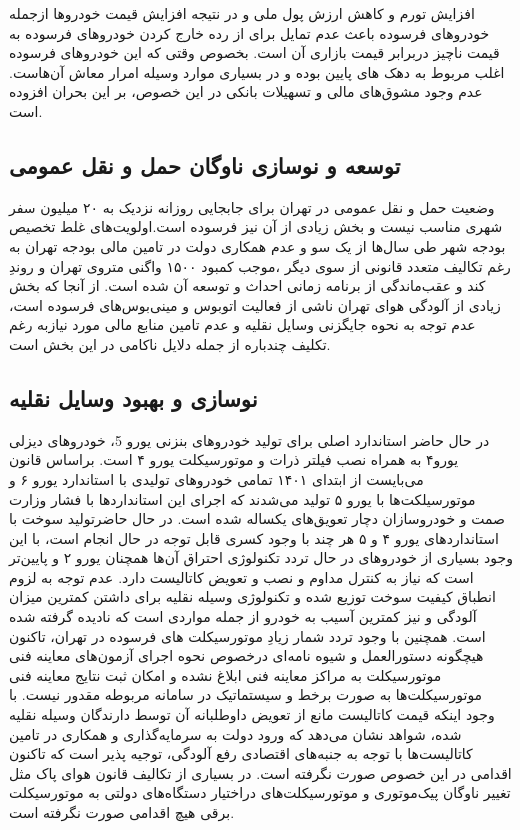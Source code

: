 \documentclass[12pt]{atu}
\begin{document}
افزایش تورم و کاهش ارزش پول ملی و در نتیجه افزایش قیمت خودروها ازجمله خودروهای فرسوده باعث عدم تمایل برای از رده خارج کردن خودروهای فرسوده به قیمت ناچیز دربرابر قیمت بازاری آن است. بخصوص وقتی که این خودروهای فرسوده اغلب مربوط به دهک های پایین بوده و در بسیاری موارد وسیله امرار معاش ‌آن‌هاست. عدم وجود مشوق‌های مالی و تسهیلات بانکی در این خصوص،  بر این بحران افزوده است. 
\cite{divan1400}
\cite{nosazi}
\cite{divan1399}
\cite{majles1385}
\cite{majles1400}
\subsection{توسعه و نوسازی ناوگان حمل و نقل عمومی}
وضعیت حمل و نقل عمومی در تهران برای جابجایی روزانه نزدیک به ۲۰ میلیون سفر شهری مناسب نیست و بخش زیادی از آن نیز فرسوده است.اولویت‌های غلط تخصیص بودجه شهر طی سال‌ها از یک سو و عدم همکاری دولت در تامین مالی بودجه تهران به رغم تکالیف متعدد قانونی از سوی دیگر ،موجب کمبود ۱۵۰۰ واگنی  متروی تهران و   روندِ کند و عقب‌ماندگی از برنامه زمانی احداث و توسعه آن شده است. 
\cite{shahrdotir}
از آنجا که بخش زیادی از آلودگی هوای تهران ناشی از فعالیت اتوبوس و مینی‌بوس‌های فرسوده است، عدم توجه به نحوه جایگزنی وسایل نقلیه و عدم تامین منابع مالی مورد نیازبه رغم تکلیف چندباره از جمله دلایل ناکامی در این بخش است.
\subsection{نوسازی و بهبود وسایل نقلیه}
در حال حاضر استاندارد اصلی برای تولید خودروهای بنزنی یورو 5، خودروهای دیزلی یورو۴ به همراه نصب فیلتر ذرات و موتورسیکلت یورو ۴ است. براساس قانون می‌بایست از ابتدای ۱۴۰۱ تمامی خودروهای تولیدی با استاندارد یورو ۶ و موتورسیلکت‌ها با یورو ۵ تولید می‌شدند که اجرای این استانداردها با فشار وزارت صمت و خودروسازان  دچار تعویق‌های یکساله شده است.
در حال حاضرتولید سوخت با استانداردهای یورو ۴ و ۵ هر چند با وجود کسری‌ قابل توجه در حال انجام است، با این وجود بسیاری از خودروهای در حال تردد تکنولوژی احتراق آن‌ها همچنان یورو ۲ و پایین‌تر است که نیاز به کنترل مداوم و نصب  و تعویض کاتالیست دارد. عدم توجه به لزوم انطباق کیفیت سوخت توزیع شده و تکنولوژی وسیله نقلیه برای داشتن کمترین میزان آلودگی و نیز کمترین آسیب به خودرو از جمله مواردی است که نادیده گرفته شده است.
همچنین با وجود تردد شمار زیادِ موتورسیکلت های فرسوده در تهران، تاکنون هیچگونه دستورالعمل و شیوه نامه‌ای درخصوص نحوه اجرای آزمون‌های معاینه فنی موتورسیکلت به مراکز معاینه فنی ابلاغ نشده و امکان ثبت نتایج معاینه فنی موتورسیکلت‌ها به صورت برخط و سیستماتیک در سامانه مربوطه مقدور نیست.
با وجود اینکه قیمت کاتالیست مانع از تعویض داوطلبانه آن توسط دارندگان وسیله نقلیه شده، شواهد نشان می‌دهد که ورود دولت به سرمایه‌گذاری و همکاری در تامین کاتالیست‌ها با توجه به جنبه‌های اقتصادی رفع آلودگی، توجیه پذیر است که تاکنون اقدامی در این خصوص صورت نگرفته است.
در بسیاری از تکالیف قانون هوای پاک مثل تغییر ناوگان پیک‌موتوری و موتورسیکلت‌های دراختیار دستگاه‌های دولتی به موتورسیکلت برقی هیچ اقدامی صورت نگرفته است.
\cite{majles1400}
\cite{majles1400b}
\end{document}
